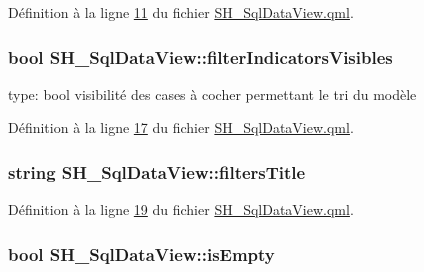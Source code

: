 Définition à la ligne \hyperlink{SH__SqlDataView_8qml_source_l00011}{11} du fichier \hyperlink{SH__SqlDataView_8qml_source}{S\-H\-\_\-\-Sql\-Data\-View.\-qml}.

\hypertarget{classSH__SqlDataView_afdc0805dc2ce3af4e9ce5331a81d7e13}{
\subsubsection[{filter\-Indicators\-Visibles}]{\setlength{\rightskip}{0pt plus 5cm}bool S\-H\-\_\-\-Sql\-Data\-View\-::filter\-Indicators\-Visibles}}\label{classSH__SqlDataView_afdc0805dc2ce3af4e9ce5331a81d7e13}
type\-: bool visibilité des cases à cocher permettant le tri du modèle 

Définition à la ligne \hyperlink{SH__SqlDataView_8qml_source_l00017}{17} du fichier \hyperlink{SH__SqlDataView_8qml_source}{S\-H\-\_\-\-Sql\-Data\-View.\-qml}.

\hypertarget{classSH__SqlDataView_a96eb074075b9ba561603a081992a1cfc}{
\subsubsection[{filters\-Title}]{\setlength{\rightskip}{0pt plus 5cm}string S\-H\-\_\-\-Sql\-Data\-View\-::filters\-Title}}\label{classSH__SqlDataView_a96eb074075b9ba561603a081992a1cfc}


Définition à la ligne \hyperlink{SH__SqlDataView_8qml_source_l00019}{19} du fichier \hyperlink{SH__SqlDataView_8qml_source}{S\-H\-\_\-\-Sql\-Data\-View.\-qml}.

\hypertarget{classSH__SqlDataView_a3ceaf016d4dace986a92e2e77772bac9}{
\subsubsection[{is\-Empty}]{\setlength{\rightskip}{0pt plus 5cm}bool S\-H\-\_\-\-Sql\-Data\-View\-::is\-Empty}}\label{classSH__SqlDataView_a3ceaf016d4dace986a92e2e77772bac9}



